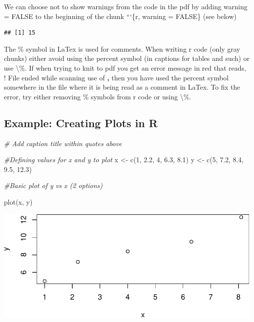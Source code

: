 \documentclass[
]{article}
\newenvironment{Shaded}{\begin{snugshade}}{\end{snugshade}}
\newcommand{\CommentTok}[1]{\textcolor[rgb]{0.56,0.35,0.01}{\textit{#1}}}
\newcommand{\DecValTok}[1]{\textcolor[rgb]{0.00,0.00,0.81}{#1}}
\newcommand{\FloatTok}[1]{\textcolor[rgb]{0.00,0.00,0.81}{#1}}
\newcommand{\FunctionTok}[1]{\textcolor[rgb]{0.00,0.00,0.00}{#1}}
\newcommand{\NormalTok}[1]{#1}
\newcommand{\OtherTok}[1]{\textcolor[rgb]{0.56,0.35,0.01}{#1}}
\begin{document}
We can choose not to show warnings from the code in the pdf by adding
warning = FALSE to the beginning of the chunk ```\{r, warning = FALSE\}
(see below)

\begin{verbatim}
## [1] 15
\end{verbatim}

\clearpage

The \% symbol in LaTex is used for comments. When writing r code (only
gray chunks) either avoid using the percent symbol (in captions for
tables and such) or use \textbackslash\%. If when trying to knit to pdf
you get an error message in red that reads, ! File ended while scanning
use of \textbf, then you have used the percent symbol somewhere in the
file where it is being read as a comment in LaTex. To fix the error, try
either removing \% symbols from r code or using \textbackslash\%.

\hypertarget{example-creating-plots-in-r}{%
\subsection{Example: Creating Plots in
R}\label{example-creating-plots-in-r}}

\begin{Shaded}
\begin{Highlighting}[]
\CommentTok{\# Add caption title within quotes above }

\CommentTok{\#Defining values for x and y to plot}
\NormalTok{x }\OtherTok{\textless{}{-}} \FunctionTok{c}\NormalTok{(}\DecValTok{1}\NormalTok{, }\FloatTok{2.2}\NormalTok{, }\DecValTok{4}\NormalTok{, }\FloatTok{6.3}\NormalTok{, }\FloatTok{8.1}\NormalTok{) }
\NormalTok{y }\OtherTok{\textless{}{-}} \FunctionTok{c}\NormalTok{(}\DecValTok{5}\NormalTok{, }\FloatTok{7.2}\NormalTok{, }\FloatTok{8.4}\NormalTok{, }\FloatTok{9.5}\NormalTok{, }\FloatTok{12.3}\NormalTok{)}

\CommentTok{\#Basic plot of y vs x (2 options)}

\FunctionTok{plot}\NormalTok{(x, y)}
\end{Highlighting}
\end{Shaded}

\includegraphics{skeleton_files/figure-latex/unnamed-chunk-5-1.pdf}
\end{document}
